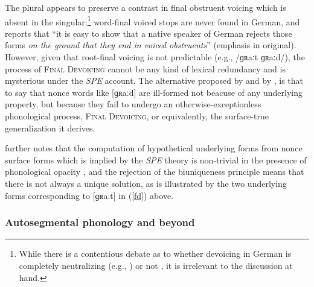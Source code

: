 \noindent The plural appears to preserve a contrast in final obstruent voicing which is absent in the singular:\footnote{While there is a contentious debate as to whether devoicing in German is completely neutralizing (e.g., \citealt{Fourakis1984}) or not \citep[e.g.,][]{Port1985}, it is irrelevant to the discussion at hand.} word-final voiced stops are never found in German, and \citet[95]{Shibatani1973} reports that ``it is easy to show that a native speaker of German rejects those forms \emph{on the ground that they end in voiced obstruents}'' (emphasis in original). However, given that root-final voicing is not predictable (e.g., /ɡʀaːt \alt{} ɡʀaːd/), the process of \textsc{Final Devoicing} cannot be any kind of lexical redundancy and is mysterious under the \emph{SPE} account. The alternative proposed by \citeauthor{Shibatani1973} and by \citet{Clayton1976}, is that to say that nonce words like [ɡʀaːd] are ill-formed not beacuse of any underlying property, but because they fail to undergo an otherwise-exceptionless phonological process, \textsc{Final Devoicing}, or equivalently, the surface-true generalization it derives.

\citet{Sommerstein1974} further notes that the computation of hypothetical underlying forms from nonce surface forms which is implied by the \emph{SPE} theory is non-trivial in the presence of phonological opacity \citep[see][528f.]{Anderson1988a}, and the rejection of the biuniqueness principle means that there is not always a unique solution, as is illustrated by the two underlying forms corresponding to [ɡʀaːt] in (\ref{fd}) above.

\subsubsection{Autosegmental phonology and beyond}

